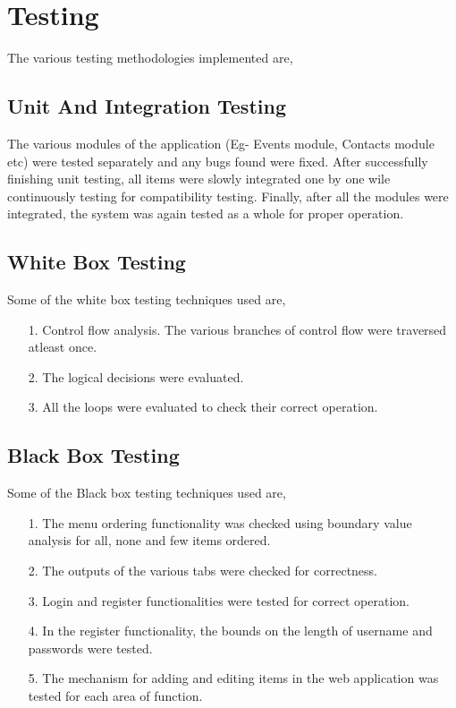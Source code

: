 \chapter{Testing}
\newpage

The various testing methodologies implemented are, 

\section{Unit And Integration Testing}
The various modules of the application (Eg- Events module, Contacts module etc) were tested separately and any bugs found were fixed. After successfully finishing unit testing, all items were slowly integrated one by one wile continuously testing for compatibility testing. Finally, after all the modules were integrated, the system was again tested as a whole for proper operation.

\section{White Box Testing}
Some of the white box testing techniques used are,

\begin{itemize}
  \item [1.] Control flow analysis. The various branches of control flow were traversed atleast once.
  \item [2.] The logical decisions were evaluated.
  \item [3.] All the loops were evaluated to check their correct operation.
\end{itemize}

\section{Black Box Testing}
Some of the Black box testing techniques used are,

\begin{itemize}
  \item [1.] The menu ordering functionality was checked using boundary value analysis for all, none and few items ordered.
  \item [2.] The outputs of the various tabs were checked for correctness.
  \item [3.] Login and register functionalities were tested for correct operation.
  \item [4.] In the register functionality, the bounds on the length of username and passwords were tested.
  \item [5.] The mechanism for adding and editing items in the web application was tested for each area of function.

\end{itemize}

